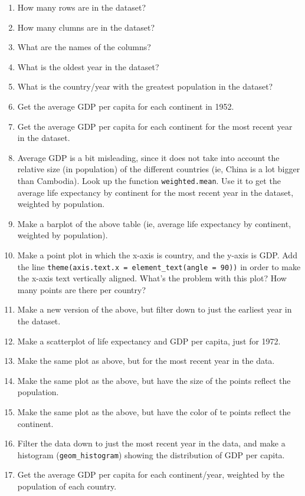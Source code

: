 \documentclass[
]{book}
\begin{document}
\begin{enumerate}
\def\labelenumi{\arabic{enumi}.}
\item
  How many rows are in the dataset?
\item
  How many clumns are in the dataset?
\item
  What are the names of the columns?
\item
  What is the oldest year in the dataset?
\item
  What is the country/year with the greatest population in the dataset?
\item
  Get the average GDP per capita for each continent in 1952.
\item
  Get the average GDP per capita for each continent for the most recent year in the dataset.
\item
  Average GDP is a bit misleading, since it does not take into account the relative size (in population) of the different countries (ie, China is a lot bigger than Cambodia). Look up the function \texttt{weighted.mean}. Use it to get the average life expectancy by continent for the most recent year in the dataset, weighted by population.
\item
  Make a barplot of the above table (ie, average life expectancy by continent, weighted by population).
\item
  Make a point plot in which the x-axis is country, and the y-axis is GDP. Add the line \texttt{theme(axis.text.x\ =\ element\_text(angle\ =\ 90))} in order to make the x-axis text vertically aligned. What's the problem with this plot? How many points are there per country?
\item
  Make a new version of the above, but filter down to just the earliest year in the dataset.
\item
  Make a scatterplot of life expectancy and GDP per capita, just for 1972.
\item
  Make the same plot as above, but for the most recent year in the data.
\item
  Make the same plot as the above, but have the size of the points reflect the population.
\item
  Make the same plot as the above, but have the color of te points reflect the continent.
\item
  Filter the data down to just the most recent year in the data, and make a histogram (\texttt{geom\_histogram}) showing the distribution of GDP per capita.
\item
  Get the average GDP per capita for each continent/year, weighted by the population of each country.

\end{enumerate}
\end{document}
